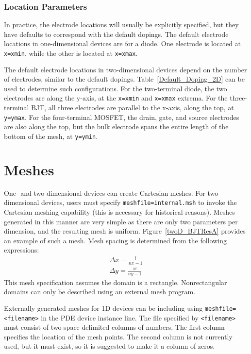 \subsubsection{Location Parameters}
In practice, the electrode locations will usually be explicitly
specified, but they have defaults to correspond with the default dopings.
The default electrode locations in one-dimensional devices are for a 
diode.  One electrode is located at \texttt{x=xmin}, while the other 
is located at \texttt{x=xmax}.

The default electrode locations in two-dimensional devices depend on the number 
of electrodes, similar to the default dopings.  Table~\ref{Default_Doping_2D} can be 
used to determine such configurations.  For the two-terminal diode, 
the two electrodes are along the  y-axis, at the \texttt{x=xmin} and 
\texttt{x=xmax} extrema.
For the three-terminal BJT, all three electrodes are parallel to the
x-axis, along the top, at \texttt{y=ymax}.  For the four-terminal MOSFET, the 
drain, gate, and source electrodes are also along the top, but the bulk 
electrode spans the entire length of the bottom of the mesh, at 
\texttt{y=ymin}.

\section{Meshes} \label{PDE_Mesh}
One- and two-dimensional devices can create Cartesian meshes.
For two-dimensional devices, users must specify \texttt{meshfile=internal.msh} 
to invoke the Cartesian meshing capability (this is necessary for historical reasons).
Meshes generated in this manner are very simple as there are only two
parameters per dimension, and the resulting mesh is uniform.  Figure~\ref{twoD_BJTResA} 
provides an example of such a mesh.  Mesh spacing is determined from the following expressions:
\begin{eqnarray}
  \Delta x = \frac{l}{nx-1}  \\
  \Delta y = \frac{w}{ny-1} 
\end{eqnarray}
This mesh specification assumes the domain is a rectangle.  
Nonrectangular domains can only be described using an external mesh program.

Externally generated meshes for 1D devices can be including using
\texttt{meshfile=<filename>} in the PDE device instance line. The file
specified by \texttt{<filename>} must consist of two space-delimited columns of
numbers. The first column specifies the location of the mesh points. The second
column is not currently used, but it must exist, so it is suggested to make it
a column of zeros.

